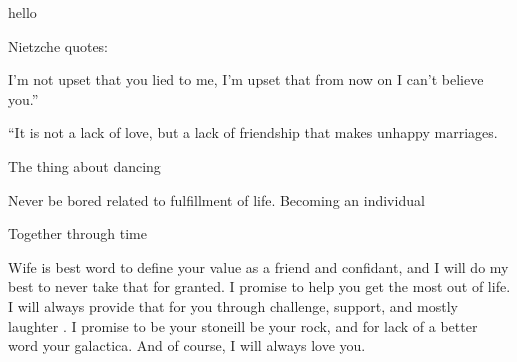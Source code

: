 \documentclass{letter}
\begin{document}
    
    hello

    Nietzche quotes:

    I'm not upset that you lied to me, I'm upset that from now on I can't believe you.” 

“It is not a lack of love, but a lack of friendship that makes unhappy marriages.

The thing about dancing


Never be bored related to fulfillment of life.  Becoming an individual

Together through time

Wife is best word to define your value as a friend and confidant, and I will do my best to never
take that for granted. I promise to help you get the most out of life.  I will always provide that for you through challenge, support, and mostly laughter .  I promise to be your stoneill be your rock, and for lack of a better word your galactica. 
And of course, I will always love you.
\end{document}
